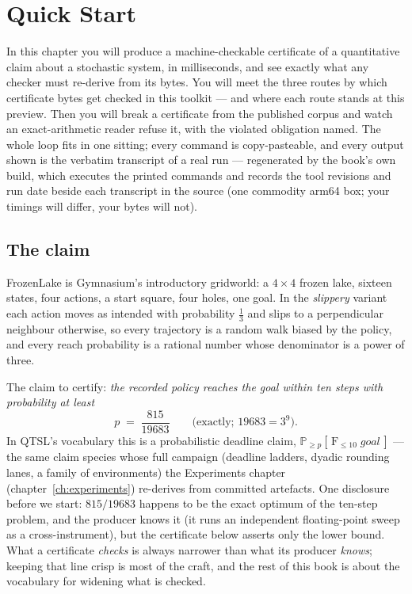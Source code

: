 \chapter{Quick Start}
\label{ch:qtsl-quickstart}

In this chapter you will produce a machine-checkable certificate of a
quantitative claim about a stochastic system, in milliseconds, and see
exactly what any checker must re-derive from its bytes. You will meet
the three routes by which certificate bytes get checked in this
toolkit --- and where each route stands at this preview.
Then you will break a certificate from the published corpus and watch
an exact-arithmetic reader refuse it, with the violated obligation
named. The whole loop fits in one sitting; every command is
copy-pasteable, and every output shown is the verbatim transcript of
a real run --- regenerated by the book's own build, which executes
the printed commands and records the tool revisions and run date
beside each transcript in the source (one commodity arm64 box; your
timings will differ, your bytes will not).

\section{The claim}
\label{sec:qs-claim}

FrozenLake is Gymnasium's introductory gridworld: a $4\times4$ frozen
lake, sixteen states, four actions, a start square, four holes, one
goal. In the \emph{slippery} variant each action moves as intended
with probability $\tfrac13$ and slips to a perpendicular neighbour
otherwise, so every trajectory is a random walk biased by the policy,
and every reach probability is a rational number whose denominator is
a power of three.

The claim to certify: \emph{the recorded policy reaches the goal
within ten steps with probability at least}
\[
  p \;=\; \frac{815}{19683}
  \qquad\text{(exactly; } 19683 = 3^9\text{).}
\]
In QTSL's vocabulary this is a probabilistic deadline claim,
$\mathbb{P}_{\ge p}\!\left[\,\mathrm{F}_{\le 10}\;\mathit{goal}\,\right]$
--- the same claim species whose full campaign (deadline ladders,
dyadic rounding lanes, a family of environments) the Experiments
chapter (chapter~\ref{ch:experiments}) re-derives from committed
artefacts.
One disclosure before we start: $815/19683$ happens to be the exact
optimum of the ten-step problem, and the producer knows it (it runs an
independent floating-point sweep as a cross-instrument), but the
certificate below asserts only the lower bound. What a certificate
\emph{checks} is always narrower than what its producer \emph{knows};
keeping that line crisp is most of the craft, and the rest of this
book is about the vocabulary for widening what is checked.

